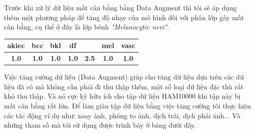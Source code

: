 \documentclass[12pt,a4paper]{article}
\begin{document}
	\noindent
	Trước khi xử lý dữ liệu mất cân bằng bằng Data Augment thì tôi sẽ áp dụng thêm một phương pháp để tăng độ nhạy của mô hình đối với phân lớp gây mất cân bằng, cụ thể ở đây là lớp bênh \textit{"Melanocytic nevi"}.\\
	
	\begin{center}
		\begin{tabular}{|c|c|c|c|c|c|c|}
			\hline
			\rowcolor[HTML]{000000} 
			{\color[HTML]{FFFFFF} \textbf{akiec}} & {\color[HTML]{FFFFFF} \textbf{bcc}} & {\color[HTML]{FFFFFF} \textbf{bkl}} & {\color[HTML]{FFFFFF} \textbf{df}} & \cellcolor[HTML]{FE0000}{\color[HTML]{FFFFFF} \textbf{nv}} & {\color[HTML]{FFFFFF} \textbf{mel}} & {\color[HTML]{FFFFFF} \textbf{vasc}} \\ \hline
			\textbf{1.0}                          & \textbf{1.0}                        & \textbf{1.0}                        & \textbf{1.0}                       & \cellcolor[HTML]{F8FF00}\textbf{2.5}                       & \textbf{1.0}                        & \textbf{1.0}                         \\ \hline
		\end{tabular}
	\end{center}
	
	\noindent
	Việc tăng cường dữ liệu (Data Augment) giúp cho tăng dữ liệu dựa trên các dữ liệu đã có mà không cần phải đi thu thập thêm, một số loại dữ liệu đặc thù rất khó thu thập. Và nó cực kỳ hữu ích cho tập dữ liệu HAM10000 khi tập này bị mất cân bằng rất lớn. Để làm giàu tập dữ liệu bằng việc tăng cường tôi thực hiện các tác động ví dụ như: xoay ảnh, phóng to ảnh, dịch trái, dịch phải ảnh... Và những tham số mà tôi sử dụng được trình bày ở bảng dưới đây.
	
\end{document}

